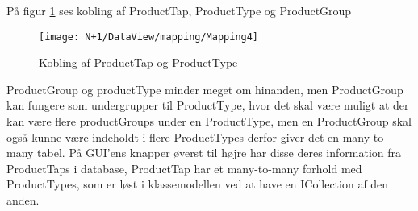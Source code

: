 På figur \ref{fig:Mapping_ProductTap_Type} ses kobling af ProductTap, ProductType og ProductGroup

\begin{figure}[H]
    \centering
    \texttt{[image: N+1/DataView/mapping/Mapping4]}
    \caption{Kobling af ProductTap og ProductType}
    \label{fig:Mapping_ProductTap_Type}
\end{figure}

ProductGroup og productType minder meget om hinanden, men ProductGroup kan fungere som undergrupper til ProductType, hvor det skal være muligt at der kan være flere productGroups under en ProductType, men en ProductGroup skal også kunne være indeholdt i flere ProductTypes derfor giver det en many-to-many tabel.
\newline
\newline
På GUI'ens knapper øverst til højre har disse deres information fra ProductTaps i database, ProductTap har et many-to-many forhold med ProductTypes, som er løst i klassemodellen ved at have en ICollection af den anden. 

